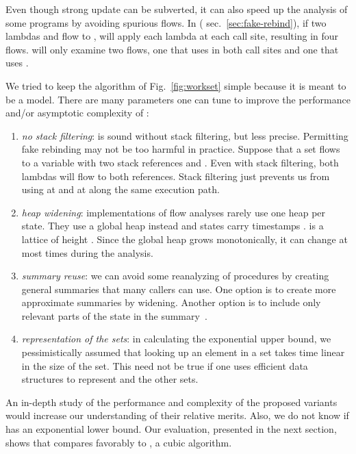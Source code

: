 \documentclass{LMCS}
\theoremstyle{definition} \newtheorem{property}[thm]{Property}
\begin{document}
Even though strong update can be subverted, it can also speed up the analysis
of some programs by avoiding spurious flows. 
In  (\confer{} sec.~\ref{sec:fake-rebind}), if two
lambdas  and  flow to ,  will apply each lambda
at each call site, resulting in four flows.
\cfat{} will only examine two flows, one that uses  in both call sites
and one that uses .

We tried to keep the algorithm of Fig.~\ref{fig:workset} simple because it is
meant to be a model.
There are many parameters one can tune to improve the performance and/or 
asymptotic complexity of \cfat:
\begin{enumerate}[]
\item 
  \emph{no stack filtering}: 
  \cfat{} is sound without stack filtering, but less precise.
  Permitting fake rebinding may not be too harmful in practice.
  Suppose that a set  flows to a variable  with 
  two stack references  and .
  Even with stack filtering, both lambdas will flow to both references.
  Stack filtering just prevents us from using  at  and  
  at  along the same execution path.
\item
  \emph{heap widening}: 
  implementations of flow analyses rarely use one heap per state. 
  They use a global heap instead and states carry timestamps 
  \cite[ch.\ 5]{diss/cmu/91/olin}.
  \dheap{} is a lattice of height .
  Since the global heap grows monotonically, it can change at most 
  times during the analysis.
\item
  \emph{summary reuse}: we can avoid some reanalyzing of procedures by 
  creating general summaries that many callers can use. 
  One option is to create more approximate summaries by widening.
  Another option is to include only relevant parts of the state in the 
  summary~\cite{conf/pldi/09/chandra/snugglebug}.
\item
  \emph{representation of the sets}: in calculating the exponential upper 
  bound, we pessimistically assumed that looking up an element in a set takes
  time linear in the size of the set. 
  This need not be true if one uses efficient data structures to represent
  \seen{} and the other sets.
\end{enumerate}
An in-depth study of the performance and complexity of the proposed variants 
would increase our understanding of their relative merits.
Also, we do not know if \cfat{} has an exponential lower bound.
Our evaluation, presented in the next section, shows that \cfat{} compares 
favorably to , a cubic algorithm.
\end{document}
